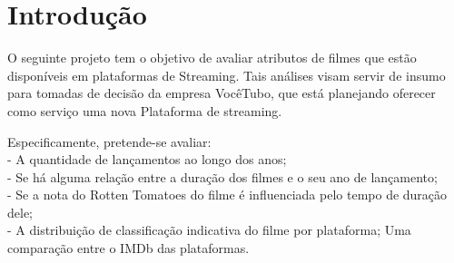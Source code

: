 \documentclass[a4paper, 12pt]{article} %
\begin{document}
\section{Introdução}

O seguinte projeto tem o objetivo de avaliar atributos de filmes que estão disponíveis em plataformas de Streaming. Tais análises visam servir de insumo para tomadas de decisão da empresa VocêTubo, que está planejando oferecer como serviço uma nova Plataforma de streaming.  

Especificamente, pretende-se avaliar:\\
- A quantidade de lançamentos ao longo dos anos;\\
- Se há alguma relação entre a duração dos filmes e o seu ano de lançamento;\\
- Se a nota do Rotten Tomatoes do filme é influenciada pelo tempo de duração dele;\\
- A distribuição de classificação indicativa do filme por plataforma;
Uma comparação entre o IMDb das plataformas.
\end{document}
